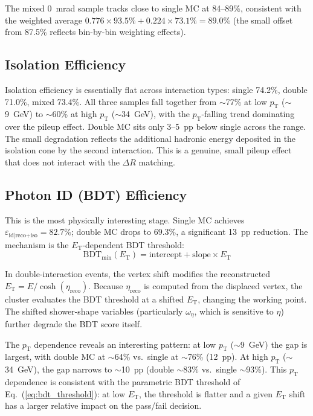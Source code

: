 \documentclass[11pt,letterpaper]{article}
\newcommand{\DR}{\ensuremath{\Delta R}}
\newcommand{\pT}{\ensuremath{p_{\text{T}}}}
\newcommand{\ET}{\ensuremath{E_{\text{T}}}}
\newcommand{\eid}{\ensuremath{\varepsilon_{\text{id}|\text{reco+iso}}}}
\begin{document}
The mixed 0~mrad sample tracks close to single MC at 84--89\%, consistent
with the weighted average $0.776 \times 93.5\% + 0.224 \times 73.1\% = 89.0\%$
(the small offset from 87.5\% reflects bin-by-bin weighting effects).

\subsection{Isolation Efficiency}

Isolation efficiency is essentially flat across interaction types:
single 74.2\%, double 71.0\%, mixed 73.4\%. All three samples fall together
from $\sim$77\% at low \pT{} ($\sim$9~GeV) to $\sim$60\% at high \pT{}
($\sim$34~GeV), with the \pT-falling trend dominating over the pileup effect.
Double MC sits only 3--5~pp below single across the range. The small
degradation reflects the additional hadronic energy deposited in
the isolation cone by the second interaction. This is a genuine, small pileup
effect that does not interact with the $\DR$ matching.

\subsection{Photon ID (BDT) Efficiency}

This is the most physically interesting stage. Single MC achieves
$\eid = 82.7\%$; double MC drops to $69.3\%$, a significant 13~pp reduction.
The mechanism is the \ET-dependent BDT threshold:
\begin{equation}
  \text{BDT}_{\text{min}}(\ET) = \text{intercept} + \text{slope} \times \ET
  \label{eq:bdt_threshold}
\end{equation}

In double-interaction events, the vertex shift modifies the reconstructed
$\ET = E / \cosh(\eta_\text{reco})$. Because $\eta_\text{reco}$ is computed
from the displaced vertex, the cluster evaluates the BDT threshold at a
shifted \ET, changing the working point. The shifted shower-shape variables
(particularly $\omega_\eta$, which is sensitive to $\eta$) further degrade
the BDT score itself.

The \pT{} dependence reveals an interesting pattern: at low \pT{} ($\sim$9~GeV)
the gap is largest, with double MC at $\sim$64\% vs.\ single at $\sim$76\%
(12~pp). At high \pT{} ($\sim$34~GeV), the gap narrows to $\sim$10~pp (double
$\sim$83\% vs.\ single $\sim$93\%). This \pT{} dependence is consistent with
the parametric BDT threshold of Eq.~(\ref{eq:bdt_threshold}): at low \ET,
the threshold is flatter and a given \ET{} shift has a larger relative impact
on the pass/fail decision.
\end{document}
